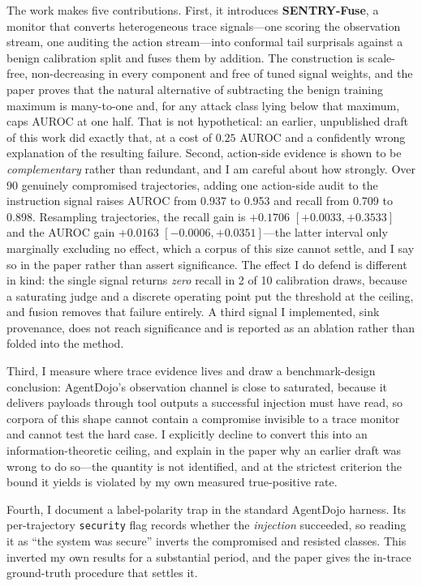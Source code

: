 \documentclass[10pt]{article}
\begin{document}
The work makes five contributions. First, it introduces \textbf{SENTRY-Fuse}, a
monitor that converts heterogeneous trace signals---one scoring the observation
stream, one auditing the action stream---into conformal tail surprisals against a
benign calibration split and fuses them by addition. The construction is
scale-free, non-decreasing in every component and free of tuned signal weights,
and the paper proves that the natural alternative of subtracting the benign
training maximum is many-to-one and, for any attack class lying below that
maximum, caps AUROC at one half. That is not hypothetical: an earlier, unpublished
draft of this work did exactly that, at a cost of $0.25$ AUROC and a confidently
wrong explanation of the resulting failure. Second,
action-side evidence is shown to be \emph{complementary} rather than redundant, and
I am careful about how strongly. Over $90$ genuinely compromised trajectories,
adding one action-side audit to the instruction signal raises $\mathrm{AUROC}$ from
0.937 to 0.953 and recall from 0.709 to 0.898. Resampling trajectories, the recall gain
is $+0.1706$ $[+0.0033, +0.3533]$ and the AUROC gain $+0.0163$ $[-0.0006, +0.0351]$---the latter
interval only marginally excluding no effect, which a corpus of this size cannot
settle, and I say so in the paper rather than assert significance. The effect I do
defend is different in kind: the single signal returns \emph{zero} recall in 2 of 10
calibration draws, because a saturating judge and a discrete operating point put the
threshold at the ceiling, and fusion removes that failure entirely. A third signal I
implemented, sink provenance, does not reach significance and is reported as an
ablation rather than folded into the method.

Third, I measure where trace evidence
lives and draw a benchmark-design conclusion: AgentDojo's observation channel is
close to saturated, because it delivers payloads through tool outputs a successful
injection must have read, so corpora of this shape cannot contain a compromise
invisible to a trace monitor and cannot test the hard case. I explicitly decline to
convert this into an information-theoretic ceiling, and explain in the paper why an
earlier draft was wrong to do so---the quantity is not identified, and at the
strictest criterion the bound it yields is violated by my own measured
true-positive rate.

Fourth, I document a label-polarity trap in the standard AgentDojo harness. Its
per-trajectory \texttt{security} flag records whether the \emph{injection}
succeeded, so reading it as ``the system was secure'' inverts the compromised and
resisted classes. This inverted my own results for a substantial period, and the
paper gives the in-trace ground-truth procedure that settles it.
\end{document}

